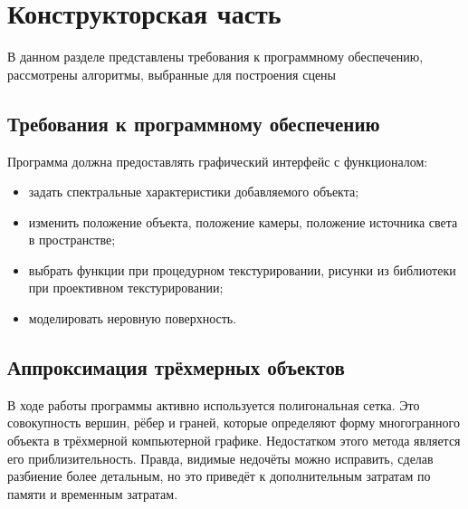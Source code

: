 \section{Конструкторская часть}
В данном разделе представлены требования к программному обеспечению, рассмотрены алгоритмы, выбранные для построения сцены

\subsection{Требования к программному обеспечению}

Программа должна предоставлять графический интерфейс с функционалом:
\begin{itemize}
	\item задать спектральные характеристики добавляемого объекта;
	\item изменить положение объекта, положение камеры, положение источника света в пространстве;
	\item выбрать функции при процедурном текстурировании, рисунки из библиотеки при проективном текстурировании;
	\item моделировать неровную поверхность.
\end{itemize}

\subsection{Аппроксимация трёхмерных объектов}
В ходе работы программы активно используется полигональная сетка.
Это совокупность вершин, рёбер и граней, которые определяют форму многогранного объекта в трёхмерной компьютерной графике.
Недостатком этого метода является его приблизительность.
Правда, видимые недочёты можно исправить, сделав разбиение более детальным, но это приведёт к дополнительным затратам по памяти и временным затратам.

